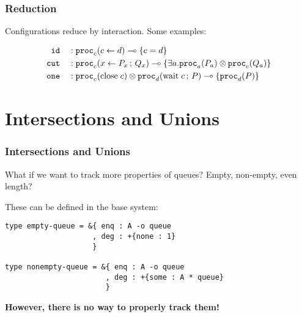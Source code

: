 \documentclass{beamer}
\begin{document}
\begin{frame}[fragile]
  \frametitle{Reduction}
  Configurations reduce by interaction. Some examples:

  \bigskip

  \begin{align*}
    \texttt{id}     \hspace{1em} & : \mathtt{proc}_{c}(c \leftarrow d) \multimap \lbrace c = d\rbrace \\
    \texttt{cut}    \hspace{1em} & : \mathtt{proc}_{c}(x \leftarrow P_x \,;\, Q_x)
        \multimap \lbrace\exists a. \mathtt{proc}_{a}(P_a) \otimes \mathtt{proc}_{c}(Q_a)\rbrace \\
    \texttt{one} \hspace{1em} & : \mathtt{proc}_{c}(\mathrm{close}\;c) \otimes \mathtt{proc}_{d}(\mathrm{wait}\;c \,;\, P)
      \multimap \lbrace\mathtt{proc}_{d}(P)\rbrace
  \end{align*}

\end{frame}


\section{Intersections and Unions}


\begin{frame}[fragile]
  \frametitle{Intersections and Unions}

  \par What if we want to track more properties of queues?
  \pause
  Empty, non-empty, even length?

  \pause
  \bigskip
  \par These can be defined in the base system:

  \bigskip

  \begin{lstlisting}
type empty-queue = &{ enq : A -o queue
                    , deg : +{none : 1}
                    }

type nonempty-queue = &{ enq : A -o queue
                       , deg : +{some : A * queue}
                       }
  \end{lstlisting}

\pause
\bigskip
\textbf{However, there is no way to properly track them!}

\end{frame}

\end{document}
